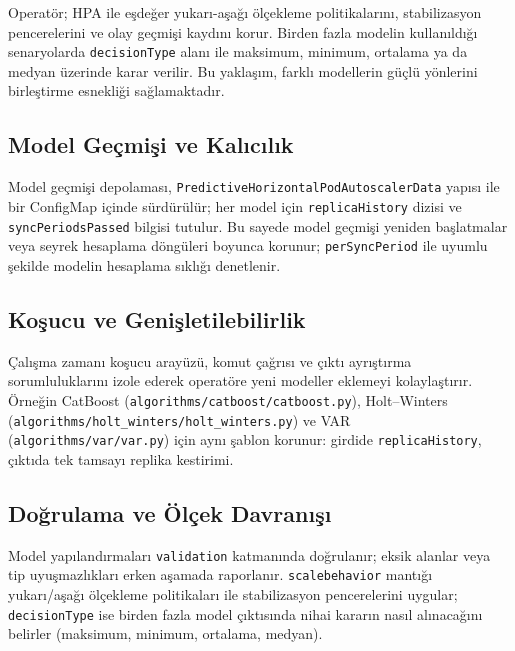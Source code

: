 Operatör; HPA ile eşdeğer yukarı-aşağı ölçekleme politikalarını, stabilizasyon pencerelerini ve olay geçmişi kaydını korur. Birden fazla modelin kullanıldığı senaryolarda \texttt{decisionType} alanı ile maksimum, minimum, ortalama ya da medyan üzerinde karar verilir. Bu yaklaşım, farklı modellerin güçlü yönlerini birleştirme esnekliği sağlamaktadır.

\subsection{Model Geçmişi ve Kalıcılık}

Model geçmişi depolaması, \texttt{PredictiveHorizontalPodAutoscalerData} yapısı ile bir ConfigMap içinde sürdürülür; her model için \texttt{replicaHistory} dizisi ve \texttt{syncPeriodsPassed} bilgisi tutulur. Bu sayede model geçmişi yeniden başlatmalar veya seyrek hesaplama döngüleri boyunca korunur; \texttt{perSyncPeriod} ile uyumlu şekilde modelin hesaplama sıklığı denetlenir.

\subsection{Koşucu ve Genişletilebilirlik}

Çalışma zamanı koşucu arayüzü, komut çağrısı ve çıktı ayrıştırma sorumluluklarını izole ederek operatöre yeni modeller eklemeyi kolaylaştırır. Örneğin CatBoost (\texttt{algorithms/catboost/catboost.py}), Holt–Winters (\texttt{algorithms/holt\_winters/holt\_winters.py}) ve VAR (\texttt{algorithms/var/var.py}) için aynı şablon korunur: girdide \texttt{replicaHistory}, çıktıda tek tamsayı replika kestirimi.

\subsection{Doğrulama ve Ölçek Davranışı}

Model yapılandırmaları \texttt{validation} katmanında doğrulanır; eksik alanlar veya tip uyuşmazlıkları erken aşamada raporlanır. \texttt{scalebehavior} mantığı yukarı/aşağı ölçekleme politikaları ile stabilizasyon pencerelerini uygular; \texttt{decisionType} ise birden fazla model çıktısında nihai kararın nasıl alınacağını belirler (maksimum, minimum, ortalama, medyan).
